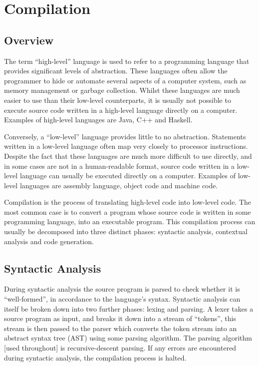 \documentclass{l4proj}
\begin{document}
\section{Compilation}
\subsection{Overview}
The term ``high-level'' language is used to refer to a programming language that provides significant levels of abstraction. These languages often allow the programmer to hide or automate several aspects of a computer system, such as memory management or garbage collection. Whilst these languages are much easier to use than their low-level counterparts, it is usually not possible to execute source code written in a high-level language directly on a computer. Examples of high-level languages are Java, C++ and Haskell.

Conversely, a ``low-level'' language provides little to no abstraction. Statements written in a low-level language often map very closely to processor instructions. Despite the fact that these languages are much more difficult to use directly, and in some cases are not in a human-readable format, source code written in a low-level language can usually be executed directly on a computer. Examples of low-level languages are assembly language, object code and machine code.

Compilation is the process of translating high-level code into low-level code. The most common case is to convert a program whose source code is written in some programming language, into an executable program. This compilation process can usually be decomposed into three distinct phases: syntactic analysis, contextual analysis and code generation.

\subsection{Syntactic Analysis}
During syntactic analysis the source program is parsed to check whether it is ``well-formed'', in accordance to the language's syntax. Syntactic analysis can itself be broken down into two further phases: lexing and parsing. A lexer takes a source program as input, and breaks it down into a stream of ``tokens'', this stream is then passed to the parser which converts the token stream into an abstract syntax tree (AST) using some parsing algorithm. The parsing algorithm [used throughout] is recursive-descent parsing. If any errors are encountered during syntactic analysis, the compilation process is halted.
\end{document}
